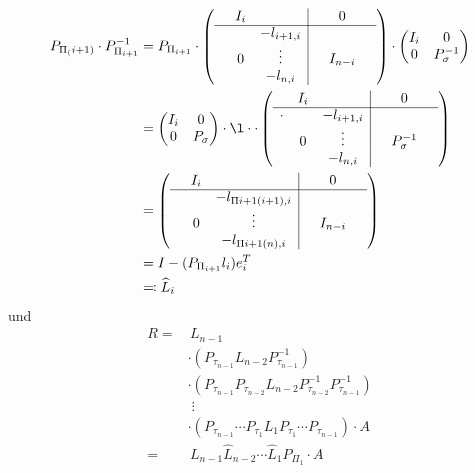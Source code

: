 \documentclass[ngerman,fontsize=11pt, paper=a4, parskip=false, titlepage=false, toc=bib]{scrbook}
\begin{document}
	\begin{align*}
	P_{\Pi_(i+1)}\cdot P_{\Pi_{i+1}}^{-1}  &= 
													P_{\Pi_{i+1}} \cdot \left(\begin{array}{ccc|ccc}
																						& I_i & && 0 & \\
																						\cline{1-6}
																						&     & -l_{i+1, i} & & & \\
																						&  0 &  \vdots      & & I_{n-i} &\\
																						&     & -l_{n, i} & &  & 
																					\end{array}\right)
																			\cdot \begin{pmatrix}
																					I_i & 0 \\
																					0 & P_{\sigma}^{-1}
																			\end{pmatrix}\\
	 &= \begin{pmatrix}
				 I_i & 0 \\
				 0 & P_{\sigma}
			 \end{pmatrix} \cdot   \l\cdot  \cdot  \left(\begin{array}{ccc|ccc}
													 & I_i & && 0 & \\
													 \cline{1-6}
												\cdot  	 &     & -l_{i+1, i} & & & \\
													 &  0 &  \vdots      & & P_{\sigma}^{-1} &\\
													 &     & -l_{n, i} & &  & 
												\end{array}\right) \\
	 &= \left(\begin{array}{ccc|ccc}
				 & I_i & && 0 & \\
				 \cline{1-6}
				 &     & -l_{\Pi{i+1}(i+1), i} & & & \\
				 &  0 &  \vdots      & & I_{n-i} &\\
				 &     & -l_{\Pi{i+1}(n), i} & &  & 
		 \end{array}\right) \\
	 &= I - (P_{\Pi_{i+1}} l_i)e_i^T\\
	 &\eqqcolon \widehat{L}_i
	\end{align*}
	und
	\begin{align*}		R =&\, L_{n-1}\\
					&\cdot (P_{\tau_{n-1}}L_{n-2}P_{\tau_{n-1}}^{-1})\\
		&				\cdot (P_{\tau_{n-1}}P_{\tau_{n-2}}L_{n-2}P_{\tau_{n-2}}^{-1}P_{\tau_{n-1}}^{-1})\\
		&\; \vdots \\
		&		 \cdot (P_{\tau_{n-1}}\dotsm P_{\tau_{1}}L_{1}P_{\tau_{1}}\dotsm P_{\tau_{n-1}}) \cdot A\\
=&\,L_{n-1}\widehat{L}_{n-2}\dotsm\widehat{L}_1P_{\Pi_{1}}\cdot A
\end{align*}
\end{document}
